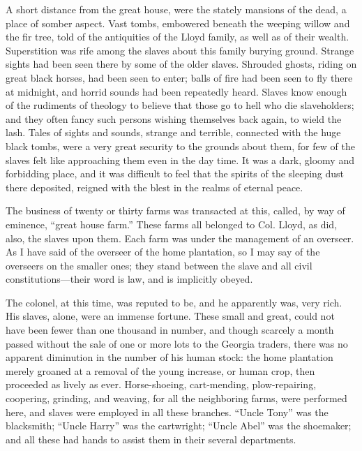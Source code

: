 A short distance from the great house, were the stately mansions of the
dead, a place of somber aspect. Vast tombs, embowered beneath the
weeping willow and the fir tree, told of the antiquities of the Lloyd
family, as well as of their wealth. Superstition was rife among the
slaves about this family burying ground. Strange sights had been seen
there by some of the older slaves. Shrouded ghosts, riding on great
black horses, had been seen to enter; balls of fire had been seen to fly
there at midnight, and horrid sounds had been repeatedly heard. Slaves
know enough of the rudiments of theology to believe that those go to
hell who die slaveholders; and they often fancy such persons wishing
themselves back again, to wield the lash. Tales of sights and sounds,
strange and terrible, connected with the huge black tombs, were a very
great security to the grounds about them, for few of the slaves felt
like approaching them even in the day time. It was a dark, gloomy and
forbidding place, and it was difficult to feel that the spirits of the
sleeping dust there deposited, reigned with the blest in the realms of
eternal peace.

The business of twenty or thirty farms was transacted at this, called,
by way of eminence, ``great house farm.'' These farms all belonged to
Col. Lloyd, as did, also, the slaves upon them. Each farm was under the
management of an overseer. As I have {\protect\hypertarget{69}{}{}}said
of the overseer of the home plantation, so I may say of the overseers on
the smaller ones; they stand between the slave and all civil
constitutions---their word is law, and is implicitly obeyed.

The colonel, at this time, was reputed to be, and he apparently was,
very rich. His slaves, alone, were an immense fortune. These small and
great, could not have been fewer than one thousand in number, and though
scarcely a month passed without the sale of one or more lots to the
Georgia traders, there was no apparent diminution in the number of his
human stock: the home plantation merely groaned at a removal of the
young increase, or human crop, then proceeded as lively as ever.
Horse-shoeing, cart-mending, plow-repairing, coopering, grinding, and
weaving, for all the neighboring farms, were performed here, and slaves
were employed in all these branches. ``Uncle Tony'' was the blacksmith;
``Uncle Harry'' was the cartwright; ``Uncle Abel'' was the shoemaker;
and all these had hands to assist them in their several departments.

